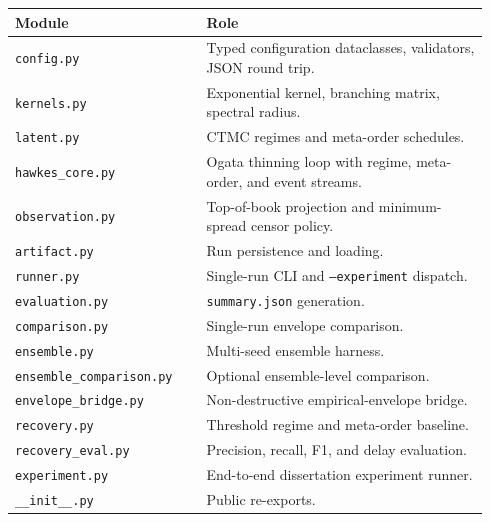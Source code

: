 \begin{tabular}{@{}p{0.38\linewidth}p{0.56\linewidth}@{}}
  \hline
  Module & Role \\
  \hline
  \texttt{config.py} & Typed configuration dataclasses, validators, JSON round trip. \\
  \texttt{kernels.py} & Exponential kernel, branching matrix, spectral radius. \\
  \texttt{latent.py} & CTMC regimes and meta-order schedules. \\
  \texttt{hawkes\_core.py} & Ogata thinning loop with regime, meta-order, and event streams. \\
  \texttt{observation.py} & Top-of-book projection and minimum-spread censor policy. \\
  \texttt{artifact.py} & Run persistence and loading. \\
  \texttt{runner.py} & Single-run CLI and \texttt{--experiment} dispatch. \\
  \texttt{evaluation.py} & \texttt{summary.json} generation. \\
  \texttt{comparison.py} & Single-run envelope comparison. \\
  \texttt{ensemble.py} & Multi-seed ensemble harness. \\
  \texttt{ensemble\_comparison.py} & Optional ensemble-level comparison. \\
  \texttt{envelope\_bridge.py} & Non-destructive empirical-envelope bridge. \\
  \texttt{recovery.py} & Threshold regime and meta-order baseline. \\
  \texttt{recovery\_eval.py} & Precision, recall, F1, and delay evaluation. \\
  \texttt{experiment.py} & End-to-end dissertation experiment runner. \\
  \texttt{\_\_init\_\_.py} & Public re-exports. \\
  \hline
\end{tabular}
